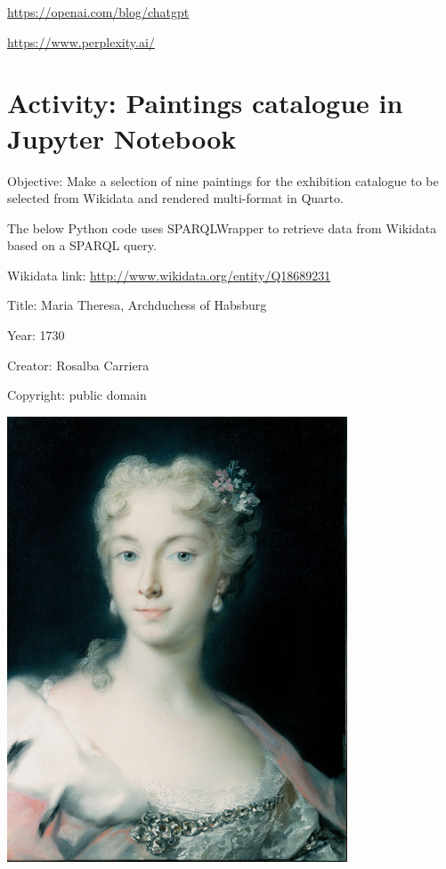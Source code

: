 \documentclass[
  letterpaper,
]{book}
\begin{document}
\url{https://openai.com/blog/chatgpt}

\url{https://www.perplexity.ai/}


\hypertarget{activity-paintings-catalogue-in-jupyter-notebook}{%
\chapter{Activity: Paintings catalogue in Jupyter
Notebook}\label{activity-paintings-catalogue-in-jupyter-notebook}}

Objective: Make a selection of nine paintings for the exhibition
catalogue to be selected from Wikidata and rendered multi-format in
Quarto.

The below Python code uses SPARQLWrapper to retrieve data from Wikidata
based on a SPARQL query.

Wikidata link: \url{http://www.wikidata.org/entity/Q18689231}

Title: Maria Theresa, Archduchess of Habsburg

Year: 1730

Creator: Rosalba Carriera

Copyright: public domain

\includegraphics{paintings_files/figure-pdf/cell-2-output-2.png}
\end{document}
